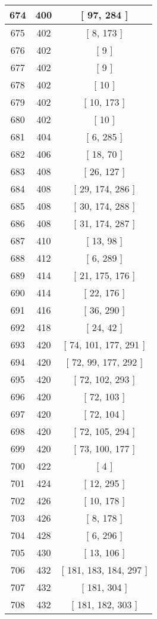 \begin{center}
\begin{longtable}[H]{|| c c c ||}
\hline
674 & 400 & [ 97, 284 ] \\ 
\hline
675 & 402 & [ 8, 173 ] \\ 
\hline
676 & 402 & [ 9 ] \\ 
\hline
677 & 402 & [ 9 ] \\ 
\hline
678 & 402 & [ 10 ] \\ 
\hline
679 & 402 & [ 10, 173 ] \\ 
\hline
680 & 402 & [ 10 ] \\ 
\hline
681 & 404 & [ 6, 285 ] \\ 
\hline
682 & 406 & [ 18, 70 ] \\ 
\hline
683 & 408 & [ 26, 127 ] \\ 
\hline
684 & 408 & [ 29, 174, 286 ] \\ 
\hline
685 & 408 & [ 30, 174, 288 ] \\ 
\hline
686 & 408 & [ 31, 174, 287 ] \\ 
\hline
687 & 410 & [ 13, 98 ] \\ 
\hline
688 & 412 & [ 6, 289 ] \\ 
\hline
689 & 414 & [ 21, 175, 176 ] \\ 
\hline
690 & 414 & [ 22, 176 ] \\ 
\hline
691 & 416 & [ 36, 290 ] \\ 
\hline
692 & 418 & [ 24, 42 ] \\ 
\hline
693 & 420 & [ 74, 101, 177, 291 ] \\ 
\hline
694 & 420 & [ 72, 99, 177, 292 ] \\ 
\hline
695 & 420 & [ 72, 102, 293 ] \\ 
\hline
696 & 420 & [ 72, 103 ] \\ 
\hline
697 & 420 & [ 72, 104 ] \\ 
\hline
698 & 420 & [ 72, 105, 294 ] \\ 
\hline
699 & 420 & [ 73, 100, 177 ] \\ 
\hline
700 & 422 & [ 4 ] \\ 
\hline
701 & 424 & [ 12, 295 ] \\ 
\hline
702 & 426 & [ 10, 178 ] \\ 
\hline
703 & 426 & [ 8, 178 ] \\ 
\hline
704 & 428 & [ 6, 296 ] \\ 
\hline
705 & 430 & [ 13, 106 ] \\ 
\hline
706 & 432 & [ 181, 183, 184, 297 ] \\ 
\hline
707 & 432 & [ 181, 304 ] \\ 
\hline
708 & 432 & [ 181, 182, 303 ] \\ 

\end{longtable}
\end{center}
